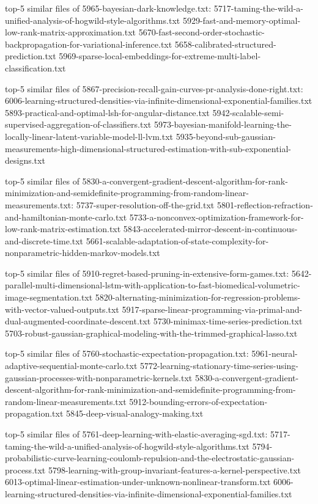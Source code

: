 \documentclass[11pt]{article}
\begin{document}
top-5 similar files of 5965-bayesian-dark-knowledge.txt:
5717-taming-the-wild-a-unified-analysis-of-hogwild-style-algorithms.txt
5929-fast-and-memory-optimal-low-rank-matrix-approximation.txt
5670-fast-second-order-stochastic-backpropagation-for-variational-inference.txt
5658-calibrated-structured-prediction.txt
5969-sparse-local-embeddings-for-extreme-multi-label-classification.txt

top-5 similar files of
5867-precision-recall-gain-curves-pr-analysis-done-right.txt:
6006-learning-structured-densities-via-infinite-dimensional-exponential-families.txt
5893-practical-and-optimal-lsh-for-angular-distance.txt
5942-scalable-semi-supervised-aggregation-of-classifiers.txt
5973-bayesian-manifold-learning-the-locally-linear-latent-variable-model-ll-lvm.txt
5935-beyond-sub-gaussian-measurements-high-dimensional-structured-estimation-with-sub-exponential-designs.txt

top-5 similar files of
5830-a-convergent-gradient-descent-algorithm-for-rank-minimization-and-semidefinite-programming-from-random-linear-measurements.txt:
5737-super-resolution-off-the-grid.txt
5801-reflection-refraction-and-hamiltonian-monte-carlo.txt
5733-a-nonconvex-optimization-framework-for-low-rank-matrix-estimation.txt
5843-accelerated-mirror-descent-in-continuous-and-discrete-time.txt
5661-scalable-adaptation-of-state-complexity-for-nonparametric-hidden-markov-models.txt

top-5 similar files of
5910-regret-based-pruning-in-extensive-form-games.txt:
5642-parallel-multi-dimensional-lstm-with-application-to-fast-biomedical-volumetric-image-segmentation.txt
5820-alternating-minimization-for-regression-problems-with-vector-valued-outputs.txt
5917-sparse-linear-programming-via-primal-and-dual-augmented-coordinate-descent.txt
5730-minimax-time-series-prediction.txt
5703-robust-gaussian-graphical-modeling-with-the-trimmed-graphical-lasso.txt

top-5 similar files of 5760-stochastic-expectation-propagation.txt:
5961-neural-adaptive-sequential-monte-carlo.txt
5772-learning-stationary-time-series-using-gaussian-processes-with-nonparametric-kernels.txt
5830-a-convergent-gradient-descent-algorithm-for-rank-minimization-and-semidefinite-programming-from-random-linear-measurements.txt
5912-bounding-errors-of-expectation-propagation.txt
5845-deep-visual-analogy-making.txt

top-5 similar files of
5761-deep-learning-with-elastic-averaging-sgd.txt:
5717-taming-the-wild-a-unified-analysis-of-hogwild-style-algorithms.txt
5794-probabilistic-curve-learning-coulomb-repulsion-and-the-electrostatic-gaussian-process.txt
5798-learning-with-group-invariant-features-a-kernel-perspective.txt
6013-optimal-linear-estimation-under-unknown-nonlinear-transform.txt
6006-learning-structured-densities-via-infinite-dimensional-exponential-families.txt
\end{document}
